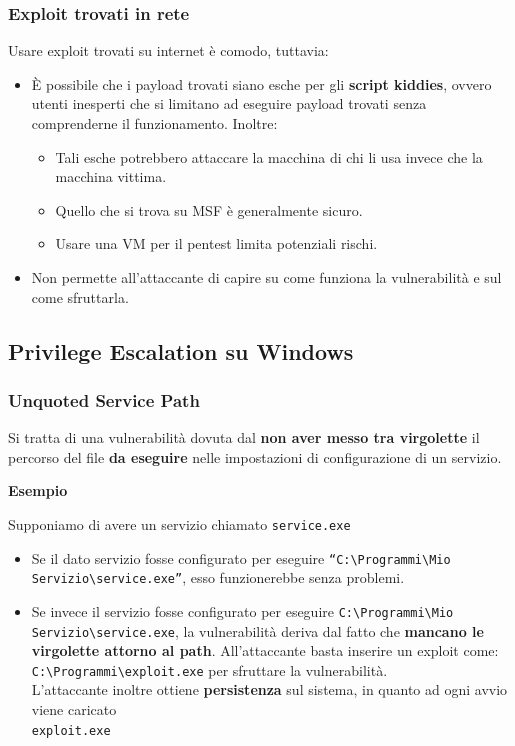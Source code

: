 \documentclass{article}
\begin{document}
\subsubsection{Exploit trovati in rete}
Usare exploit trovati su internet è comodo, tuttavia:
\begin{itemize}
	\item È possibile che i payload trovati siano esche per gli \textbf{script kiddies}, ovvero utenti inesperti che si limitano ad eseguire payload trovati senza comprenderne il funzionamento. Inoltre:
	\begin{itemize}
		\item Tali esche potrebbero attaccare la macchina di chi li usa invece che la macchina vittima.
		\item Quello che si trova su MSF è generalmente sicuro.
		\item Usare una VM per il pentest limita potenziali rischi.
	\end{itemize}
	
	\item Non permette all'attaccante di capire su come funziona la vulnerabilità e sul come sfruttarla.
\end{itemize}
\newpage
\subsection{Privilege Escalation su Windows}
\subsubsection{Unquoted Service Path}
Si tratta di una vulnerabilità dovuta dal \textbf{non aver messo tra virgolette} il percorso del file \textbf{da eseguire} nelle impostazioni di configurazione di un servizio.

\textbf{Esempio}

Supponiamo di avere un servizio chiamato \verb|service.exe|
\begin{itemize}
	\item Se il dato servizio fosse configurato per eseguire \verb|“C:\Programmi\Mio Servizio\service.exe”|, esso funzionerebbe senza problemi.
	
	\item Se invece il servizio fosse configurato per eseguire \verb|C:\Programmi\Mio Servizio\service.exe|, la vulnerabilità deriva dal fatto che \textbf{mancano le virgolette attorno al path}.
	All'attaccante basta inserire un exploit come: \verb|C:\Programmi\exploit.exe| per sfruttare la vulnerabilità.\\
	L'attaccante inoltre ottiene \textbf{persistenza} sul sistema, in quanto ad ogni avvio viene caricato\\ \verb|exploit.exe|
\end{itemize}
\end{document}
